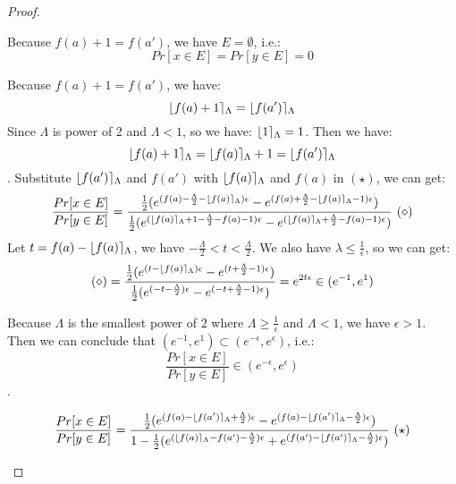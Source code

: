 \documentclass[a4paper,11pt]{article}
\begin{document}
\begin{proof}
\begin{itemize}
\begin{itemize}
	Because $f(a) + 1 = f(a')$, we have $E = \emptyset$, i.e.:
	$$Pr[x \in E] = Pr[y \in E] = 0$$ 
	
	Because $f(a) + 1 = f(a')$, we have:
	$$\lfloor f(a) + 1 \rceil_{\Lambda} = \lfloor f(a') \rceil_{\Lambda}$$
	Since $\Lambda$ is power of 2 and $\Lambda < 1$, so we have: $\lfloor 1 \rceil_{\Lambda} = 1$. Then we have:
	$$\lfloor f(a) + 1 \rceil_{\Lambda} = \lfloor f(a) \rceil_{\Lambda} + 1 = \lfloor f(a') \rceil_{\Lambda} $$.
	Substitute $\lfloor f(a') \rceil_{\Lambda}$ and $f(a')$ with $\lfloor f(a) \rceil_{\Lambda}$ and $f(a)$ in $(\star)$, we can get:
	\[
	\frac{Pr[x \in E]}{Pr[y \in E]} 
	= \frac{
			\frac{1}{2}(
				e^{(f(a) - \frac{\Lambda}{2} - \lfloor f(a) \rceil_{\Lambda})\epsilon}
				- e^{(f(a) + \frac{\Lambda}{2} - \lfloor f(a) \rceil_{\Lambda} - 1)\epsilon})
			}
			{
			\frac{1}{2}(
				e^{(\lfloor f(a) \rceil_{\Lambda} + 1 - \frac{\Lambda}{2} - f(a) - 1)\epsilon}
				- e^{(\lfloor f(a) \rceil_{\Lambda} + \frac{\Lambda}{2}  - f(a) - 1)\epsilon})
			}~(\diamond) 
	\]
	Let $t = f(a) - \lfloor f(a) \rceil_{\Lambda}$, we have $-\frac{\Lambda}{2} < t < \frac{\Lambda}{2}$. We also have $\lambda \leq \frac{1}{\epsilon}$, so we can get:
	\[
	(\diamond) = 
	\frac{
		\frac{1}{2}(
			e^{(t - \lfloor f(a) \rceil_{\Lambda})\epsilon}
			- e^{(t + \frac{\Lambda}{2} - 1)\epsilon})
		}
		{
		\frac{1}{2}(
			e^{(-t - \frac{\Lambda}{2})\epsilon}
			- e^{(-t + \frac{\Lambda}{2} - 1)\epsilon})
		}
	= e^{2t\epsilon} \in (e^{-1}, e^1)
	\]
	
	Because $\Lambda$ is the smallest power of 2 where $\Lambda \geq \frac{1}{\epsilon}$ and $\Lambda < 1$, we have $\epsilon > 1$.
	Then we can conclude that $(e^{-1}, e^1) \subset (e^{-\epsilon}, e^{\epsilon})$, i.e.:
	$$\frac{Pr[x \in E]}{Pr[y \in E]} \in (e^{-\epsilon}, e^{\epsilon}) $$.
	\end{itemize}
	\[
	\frac{Pr[x \in E]}{Pr[y \in E]} 
	= \frac{
			\frac{1}{2}(
				e^{(f(a) - \round{f(a')}_{\Lambda} + \frac{\Lambda}{2})\epsilon}
				- e^{(f(a) - \round{f(a')}_{\Lambda} - \frac{\Lambda}{2})\epsilon})
			}
			{1 - {\frac{1}{2}(
				e^{(\round{f(a)}_{\Lambda} - f(a') - \frac{\Lambda}{2})\epsilon}
				+ e^{(f(a') - \round{f(a')}_{\Lambda} -\frac{\Lambda}{2})\epsilon})}
			}~(\star)
	\]


\end{itemize}
\end{proof}
\end{document}
